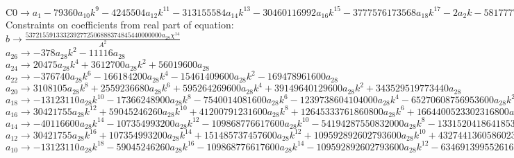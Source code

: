 \documentclass[12pt,a4paper,draft]{article}
\begin{document}
$\text{C0}\to a_{1}-79360 a_{10} k^9-4245504 a_{12} k^{11}-313155584 a_{14} k^{13}-30460116992 a_{16} k^{15}-3777576173568 a_{18} k^{17}-2 a_{2} k-581777702256640 a_{20} k^{19}-108932957168730112 a_{22} k^{21}-24370173276164456448 a_{24} k^{23}-6419958484945407574016 a_{26} k^{25}-1967044844910430876860416 a_{28} k^{27}-8 a_{4} k^3-96 a_{6} k^5-2176 a_{8} k^7$\\
Constraints on coefficients from real part of equation:
\\$b\to \frac{5372155913332392772506888374845440000000 a_{28} \chi ^{14}}{A^2}$\\
$a_{26}\to -378 a_{28} k^2-11116 a_{28}$\\
$a_{24}\to 20475 a_{28} k^4+3612700 a_{28} k^2+56019600 a_{28}$\\
$a_{22}\to -376740 a_{28} k^6-166184200 a_{28} k^4-15461409600 a_{28} k^2-169478961600 a_{28}$\\
$a_{20}\to 3108105 a_{28} k^8+2559236680 a_{28} k^6+595264269600 a_{28} k^4+39149640129600 a_{28} k^2+343529519773440 a_{28}$\\
$a_{18}\to -13123110 a_{28} k^{10}-17366248900 a_{28} k^8-7540014081600 a_{28} k^6-1239738604104000 a_{28} k^4-65270608756953600 a_{28} k^2-493007322059965440 a_{28}$\\
$a_{16}\to 30421755 a_{28} k^{12}+59045246260 a_{28} k^{10}+41200791231600 a_{28} k^8+12645333761860800 a_{28} k^6+1664400523302316800 a_{28} k^4+75430120275174712320 a_{28} k^2+516028473557238558720 a_{28}$\\
$a_{14}\to -40116600 a_{28} k^{14}-107354993200 a_{28} k^{12}-109868776617600 a_{28} k^{10}-54194287550832000 a_{28} k^8-13315204186418534400 a_{28} k^6-1508602405503494246400 a_{28} k^4-61923416826868627046400 a_{28} k^2-399735662805056438353920 a_{28}$\\
$a_{12}\to 30421755 a_{28} k^{16}+107354993200 a_{28} k^{14}+151485737457600 a_{28} k^{12}+109592892602793600 a_{28} k^{10}+43274413605860236800 a_{28} k^8+9152187926721198428160 a_{28} k^6+939171821874174176870400 a_{28} k^4+36375945315260135890206720 a_{28} k^2+230016245989292040943042560 a_{28}$\\
$a_{10}\to -13123110 a_{28} k^{18}-59045246260 a_{28} k^{16}-109868776617600 a_{28} k^{14}-109592892602793600 a_{28} k^{12}-63469139955261680640 a_{28} k^{10}-21573014398699967723520 a_{28} k^8-4132356016246366378229760 a_{28} k^6-400135398467861494792273920 a_{28} k^4-15181072235293274702240808960 a_{28} k^2-97721977949460427510235791360 a_{28}$\\
\end{document}
